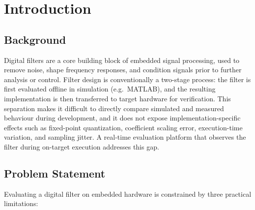 
\graphicspath{{figures/}}

\chapter{Introduction}
\label{chap:introduction}


\section{Background}
\label{sec:background}

Digital filters are a core building block of embedded signal processing, used
to remove noise, shape frequency responses, and condition signals prior to
further analysis or control. Filter design is conventionally a two-stage
process: the filter is first evaluated offline in simulation (e.g.\ MATLAB),
and the resulting implementation is then transferred to target hardware for
verification. This separation makes it difficult to directly compare simulated
and measured behaviour during development, and it does not expose
implementation-specific effects such as fixed-point quantization, coefficient
scaling error, execution-time variation, and sampling jitter. A real-time
evaluation platform that observes the filter during on-target execution
addresses this gap.


\section{Problem Statement}
\label{sec:problem_statement}

Evaluating a digital filter on embedded hardware is constrained by three
practical limitations:

